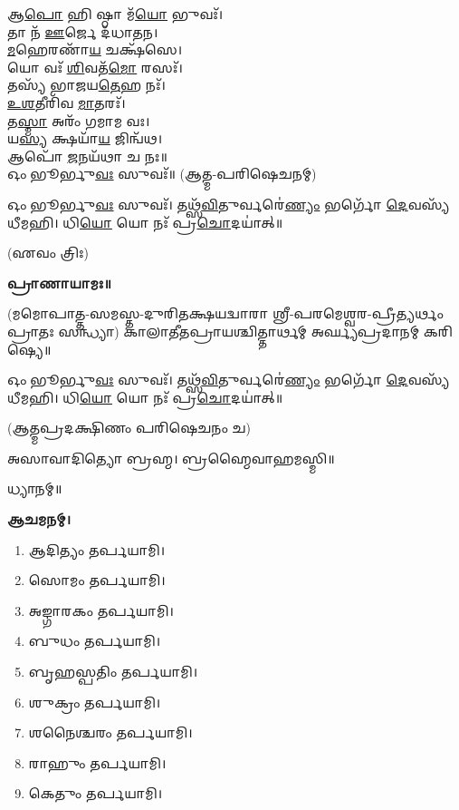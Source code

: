 𑌆\-\ul{𑌪𑍋} 𑌹𑌿 𑌷𑍍𑌠𑌾 𑌮᳴\-\ul{𑌯𑍋} 𑌭𑍁𑌵𑌃᳴।\\
𑌤𑌾 𑌨᳴ \ul{𑌊}\-𑌰𑍍𑌜𑍇 𑌦᳴𑌧𑌾𑌤𑌨।\\
\-\ul{𑌮}\-𑌹𑍇𑌰𑌣𑌾᳴\-\ul{𑌯} 𑌚𑌕𑍍𑌷᳴𑌸𑍇।\\
𑌯𑍋 𑌵𑌃᳴ \ul{𑌶𑌿}\-𑌵𑌤᳴\-\ul{𑌮𑍋} 𑌰𑌸𑌃᳴।\\
𑌤𑌸𑍍𑌯᳴ 𑌭𑌾𑌜𑌯\-\ul{𑌤𑍇}\-𑌹 𑌨𑌃᳴।\\
\-\ul{𑌉}\-\-\ul{𑌶}\-𑌤𑍀𑌰𑌿᳴𑌵 \ul{𑌮𑌾}\-𑌤𑌰𑌃᳴।\\
𑌤\-\ul{𑌸𑍍𑌮𑌾} 𑌅𑌰𑌂᳴ 𑌗𑌮𑌾𑌮 𑌵𑌃।\\
𑌯\-\ul{𑌸𑍍𑌯} 𑌕𑍍𑌷𑌯𑌾᳴\-\ul{𑌯} 𑌜𑌿𑌨𑍍𑌵᳴𑌥।\\
𑌆𑌪𑍋᳴ \ul{𑌜}\-𑌨𑌯᳴𑌥𑌾 𑌚 𑌨𑌃॥\\

𑌓𑌂 𑌭𑍂𑌰𑍍𑌭𑍁\-\ul{𑌵𑌃} 𑌸𑍁𑌵𑌃᳴॥ (𑌆𑌤𑍍𑌮-𑌪𑌰𑌿𑌷𑍇𑌚𑌨𑌮𑍍)



𑌓𑌂 𑌭𑍂𑌰𑍍𑌭𑍁\-\ul{𑌵𑌃} 𑌸𑍁𑌵𑌃᳴। 𑌤𑌥𑍍𑌸᳴\-\ul{𑌵𑌿}\-𑌤𑍁𑌰𑍍𑌵𑌰𑍇॑\-\ul{𑌣𑍍𑌯𑌂} 𑌭𑌰𑍍𑌗𑍋᳴ \ul{𑌦𑍇}\-𑌵𑌸𑍍𑌯᳴ 𑌧𑍀𑌮𑌹𑌿। 𑌧𑌿\-\ul{𑌯𑍋} 𑌯𑍋 𑌨𑌃᳴ 𑌪𑍍𑌰\-\ul{𑌚𑍋}\-𑌦𑌯𑌾॑𑌤𑍍॥

\hfill{(𑌏𑌵𑌂 𑌤𑍍𑌰𑌿𑌃)}


\textbf{𑌪𑍍𑌰𑌾𑌣𑌾𑌯𑌾𑌮𑌃॥}

(𑌮𑌮𑍋𑌪𑌾𑌤𑍍𑌤-𑌸𑌮𑌸𑍍𑌤-𑌦𑍁𑌰𑌿𑌤𑌕𑍍𑌷𑌯𑌦𑍍𑌵𑌾𑌰𑌾 𑌶𑍍𑌰𑍀-𑌪𑌰𑌮𑍇𑌶𑍍𑌵𑌰-𑌪𑍍𑌰𑍀𑌤𑍍𑌯𑌰𑍍𑌥𑌂 𑌪𑍍𑌰𑌾𑌤𑌃 𑌸𑌨𑍍𑌧𑍍𑌯𑌾)
𑌕𑌾𑌲𑌾𑌤𑍀𑌤𑌪𑍍𑌰𑌾𑌯𑌶𑍍𑌚𑌿𑌤𑍍𑌤𑌾𑌰𑍍𑌥𑌮𑍍 𑌅𑌰𑍍𑌘𑍍𑌯𑌪𑍍𑌰𑌦𑌾𑌨𑌮𑍍 𑌕𑌰𑌿𑌷𑍍𑌯𑍇॥

𑌓𑌂 𑌭𑍂𑌰𑍍𑌭𑍁\-\ul{𑌵𑌃} 𑌸𑍁𑌵𑌃᳴। 𑌤𑌥𑍍𑌸᳴\-\ul{𑌵𑌿}\-𑌤𑍁𑌰𑍍𑌵𑌰𑍇॑\-\ul{𑌣𑍍𑌯𑌂} 𑌭𑌰𑍍𑌗𑍋᳴ \ul{𑌦𑍇}\-𑌵𑌸𑍍𑌯᳴ 𑌧𑍀𑌮𑌹𑌿। 𑌧𑌿\-\ul{𑌯𑍋} 𑌯𑍋 𑌨𑌃᳴ 𑌪𑍍𑌰\-\ul{𑌚𑍋}\-𑌦𑌯𑌾॑𑌤𑍍॥

(𑌆𑌤𑍍𑌮𑌪𑍍𑌰𑌦𑌕𑍍𑌷𑌿𑌣𑌂 𑌪𑌰𑌿𑌷𑍇𑌚𑌨𑌂 𑌚)


𑌅𑌸𑌾𑌵𑌾𑌦𑌿𑌤𑍍𑌯𑍋 𑌬𑍍𑌰𑌹𑍍𑌮। 𑌬𑍍𑌰𑌹𑍍𑌮𑍈𑌵𑌾𑌹𑌮𑌸𑍍𑌮𑌿॥

𑌧𑍍𑌯𑌾𑌨𑌮𑍍॥

\textbf{𑌆𑌚𑌮𑌨𑌮𑍍।}



\begin{enumerate}
 \item 𑌆𑌦𑌿𑌤𑍍𑌯𑌂 𑌤𑌰𑍍𑌪𑌯𑌾𑌮𑌿।
 \item 𑌸𑍋𑌮𑌂 𑌤𑌰𑍍𑌪𑌯𑌾𑌮𑌿।
 \item 𑌅𑌙𑍍𑌗𑌾𑌰𑌕𑌂 𑌤𑌰𑍍𑌪𑌯𑌾𑌮𑌿।
 \item 𑌬𑍁𑌧𑌂 𑌤𑌰𑍍𑌪𑌯𑌾𑌮𑌿।
 \item 𑌬𑍃𑌹𑌸𑍍𑌪𑌤𑌿𑌂 𑌤𑌰𑍍𑌪𑌯𑌾𑌮𑌿।
 \item 𑌶𑍁𑌕𑍍𑌰𑌂 𑌤𑌰𑍍𑌪𑌯𑌾𑌮𑌿।
 \item 𑌶𑌨𑍈𑌶𑍍𑌚𑌰𑌂 𑌤𑌰𑍍𑌪𑌯𑌾𑌮𑌿।
 \item 𑌰𑌾𑌹𑍁𑌂 𑌤𑌰𑍍𑌪𑌯𑌾𑌮𑌿।
 \item 𑌕𑍇𑌤𑍁𑌂 𑌤𑌰𑍍𑌪𑌯𑌾𑌮𑌿।
\end{enumerate}

